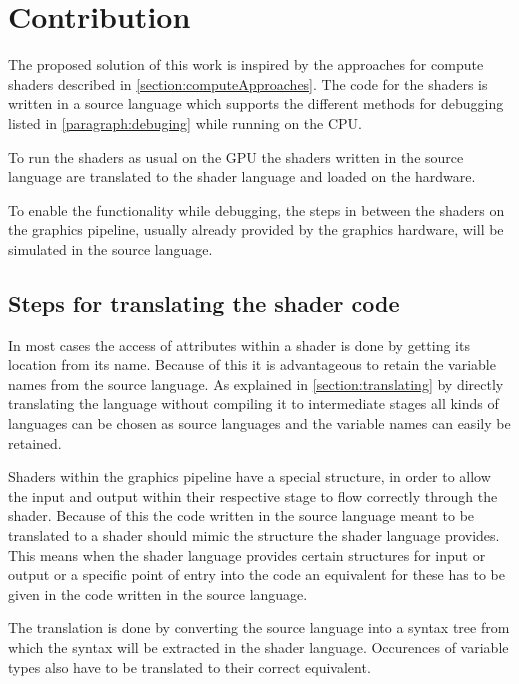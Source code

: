 

\chapter{Contribution}\label{cha:Contribution}

The proposed solution of this work is inspired by the approaches for compute shaders described in \autoref{section:computeApproaches}. The code for the shaders is written in a source language which supports the different methods for debugging listed in \autoref{paragraph:debuging} while running on the CPU.

To run the shaders as usual on the GPU the shaders written in the source language are translated to the shader language and loaded on the hardware.

To enable the functionality while debugging, the steps in between the shaders on the graphics pipeline, usually already provided by the graphics hardware, will be simulated in the source language.

\section{Steps for translating the shader code}
\label{section:contribution_translating}

In most cases the access of attributes within a shader is done by getting its location from its name. Because of this it is advantageous to retain the variable names from the source language. As explained in \autoref{section:translating} by directly translating the language without compiling it to intermediate stages all kinds of languages can be chosen as source languages and the variable names can easily be retained.

Shaders within the graphics pipeline have a special structure, in order to allow the input and output within their respective stage to flow correctly through the shader. Because of this the code written in the source language meant to be translated to a shader should mimic the structure the shader language provides. This means when the shader language provides certain structures for input or output or a specific point of entry into the code an equivalent for these has to be given in the code written in the source language.

The translation is done by converting the source language into a syntax tree from which the syntax will be extracted in the shader language. Occurences of variable types also have to be translated to their correct equivalent.

